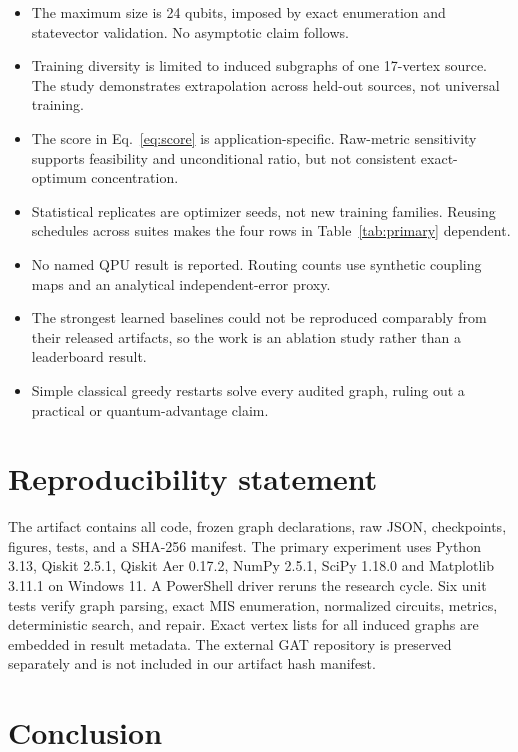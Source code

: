 \documentclass[10pt,twocolumn]{article}
\begin{document}
\begin{itemize}[leftmargin=*]
    \item The maximum size is 24 qubits, imposed by exact enumeration and statevector validation. No asymptotic claim follows.
    \item Training diversity is limited to induced subgraphs of one 17-vertex source. The study demonstrates extrapolation across held-out sources, not universal training.
    \item The score in Eq.~\eqref{eq:score} is application-specific. Raw-metric sensitivity supports feasibility and unconditional ratio, but not consistent exact-optimum concentration.
    \item Statistical replicates are optimizer seeds, not new training families. Reusing schedules across suites makes the four rows in Table~\ref{tab:primary} dependent.
    \item No named QPU result is reported. Routing counts use synthetic coupling maps and an analytical independent-error proxy.
    \item The strongest learned baselines could not be reproduced comparably from their released artifacts, so the work is an ablation study rather than a leaderboard result.
    \item Simple classical greedy restarts solve every audited graph, ruling out a practical or quantum-advantage claim.
\end{itemize}

\section{Reproducibility statement}

The artifact contains all code, frozen graph declarations, raw JSON, checkpoints, figures, tests, and a SHA-256 manifest. The primary experiment uses Python 3.13, Qiskit 2.5.1, Qiskit Aer 0.17.2, NumPy 2.5.1, SciPy 1.18.0 and Matplotlib 3.11.1 on Windows 11. A PowerShell driver reruns the research cycle. Six unit tests verify graph parsing, exact MIS enumeration, normalized circuits, metrics, deterministic search, and repair. Exact vertex lists for all induced graphs are embedded in result metadata. The external GAT repository is preserved separately and is not included in our artifact hash manifest.

\section{Conclusion}
\end{document}
